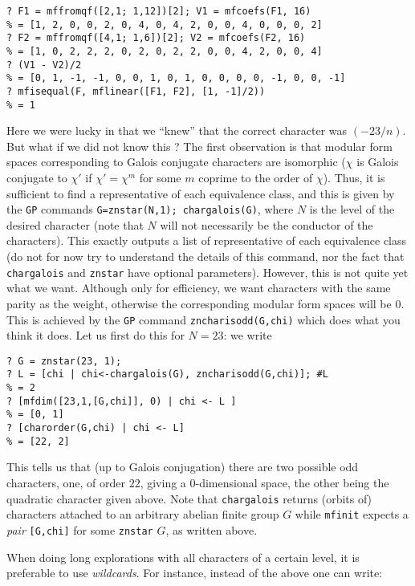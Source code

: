 \documentclass[11pt]{article}
\def\kbd#1{{\tt #1}}
\begin{document}
\begin{verbatim}
? F1 = mffromqf([2,1; 1,12])[2]; V1 = mfcoefs(F1, 16)
% = [1, 2, 0, 0, 2, 0, 4, 0, 4, 2, 0, 0, 4, 0, 0, 0, 2]
? F2 = mffromqf([4,1; 1,6])[2]; V2 = mfcoefs(F2, 16)
% = [1, 0, 2, 2, 2, 0, 2, 0, 2, 2, 0, 0, 4, 2, 0, 0, 4]
? (V1 - V2)/2
% = [0, 1, -1, -1, 0, 0, 1, 0, 1, 0, 0, 0, 0, -1, 0, 0, -1]
? mfisequal(F, mflinear([F1, F2], [1, -1]/2))
% = 1
\end{verbatim}

Here we were lucky in that we ``knew'' that the correct character was
$(-23/n)$. But what if we did not know this ? The first observation is
that modular form spaces corresponding to Galois conjugate characters
are isomorphic ($\chi$ is Galois conjugate to $\chi'$ if $\chi'=\chi^m$
for some $m$ coprime to the order of $\chi$). Thus, it is sufficient
to find a representative of each equivalence class, and this is given by
the \kbd{GP} commands \kbd{G=znstar(N,1); chargalois(G)}, where $N$ is the
level of the desired character (note that $N$ will not necessarily be
the conductor of the characters). This exactly outputs a list of representative
of each equivalence class (do not for now try to understand the details of
this command, nor the fact that \kbd{chargalois} and \kbd{znstar} have
optional parameters). However, this is not quite yet what we want.
Although only for efficiency, we want characters with the same parity
as the weight, otherwise the corresponding modular form spaces will be $0$.
This is achieved by the \kbd{GP} command \kbd{zncharisodd(G,chi)} which
does what you think it does. Let us first do this for $N=23$: we write
\begin{verbatim}
? G = znstar(23, 1);
? L = [chi | chi<-chargalois(G), zncharisodd(G,chi)]; #L
% = 2
? [mfdim([23,1,[G,chi]], 0) | chi <- L ]
% = [0, 1]
? [charorder(G,chi) | chi <- L]
% = [22, 2]
\end{verbatim}

This tells us that (up to Galois conjugation) there are two possible odd
characters, one, of order $22$, giving a $0$-dimensional space, the other
being the quadratic character given above. Note that \kbd{chargalois}
returns (orbits of) characters attached to an arbitrary abelian finite group
$G$ while \kbd{mfinit} expects a \emph{pair} \kbd{[G,chi]} for some
\kbd{znstar} $G$, as written above.

When doing long explorations with all characters of a certain level, it
is preferable to use \emph{wildcards}. For instance, instead of the above
one can write:
\end{document}

